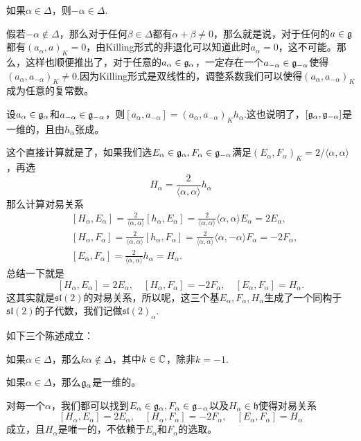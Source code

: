 \pro 如果$\alpha\in\Delta$，则$-\alpha\in\Delta$.

假若$-\alpha\notin\Delta$，那么对于任何$\beta\in\Delta$都有$\alpha+\beta\neq 0$，那么就是说，对于任何的$a\in {\mathfrak{g}}$都有$(a_\alpha,a)_K=0$，由Killing形式的非退化可以知道此时$a_\alpha=0$，这不可能。那么，这样也顺便推出了，对于任意的$a_\alpha\in{\mathfrak{g}}_{\alpha}$，一定存在一个$a_{-\alpha}\in{\mathfrak{g}}_{-\alpha}$使得$(a_\alpha,a_{-\alpha})_K\neq 0$.因为Killing形式是双线性的，调整系数我们可以使得$(a_\alpha,a_{-\alpha})_K$成为任意的复常数。


\pro 设$a_\alpha \in {\mathfrak{g}}_\alpha$和$a_{-\alpha} \in {\mathfrak{g}}_{-\alpha}$，则$[a_{\alpha},a_{-\alpha}]=(a_{\alpha},a_{-\alpha})_Kh_\alpha$.这也说明了，$[{\mathfrak{g}}_{\alpha},{\mathfrak{g}}_{-\alpha}]$是一维的，且由$h_\alpha$张成。


这个直接计算就是了，如果我们选$E_\alpha\in{\mathfrak{g}}_\alpha,F_\alpha\in{\mathfrak{g}}_{-\alpha}$满足$(E_\alpha,F_{\alpha})_K=2/\langle \alpha,\alpha \rangle$，再选
\[
	H_\alpha=\frac{2}{\langle \alpha,\alpha \rangle}h_\alpha
\]
那么计算对易关系
\[
	\begin{split}
	&[H_\alpha,E_\alpha]=\frac{2}{\langle \alpha,\alpha \rangle}[h_\alpha,E_\alpha]=\frac{2}{\langle \alpha,\alpha \rangle}\langle \alpha,\alpha \rangle E_\alpha=2E_\alpha,\\
	&[H_\alpha,F_\alpha]=\frac{2}{\langle \alpha,\alpha \rangle}[h_\alpha,F_\alpha]=\frac{2}{\langle \alpha,\alpha \rangle}\langle \alpha,-\alpha \rangle F_\alpha=-2F_\alpha,\\
	&[E_\alpha,F_\alpha]=\frac{2}{\langle \alpha,\alpha \rangle}h_\alpha=H_\alpha.
	\end{split}
\]
总结一下就是
\[
	[H_\alpha,E_\alpha]=2E_\alpha,\quad[H_\alpha,F_\alpha]=-2F_\alpha,\quad[E_\alpha,F_\alpha]=H_\alpha.
\]
这其实就是$\mathfrak{sl}(2)$的对易关系，所以呢，这三个基$E_\alpha,F_\alpha,H_\alpha$生成了一个同构于$\mathfrak{sl}(2)$的子代数，我们记做$\mathfrak{sl}(2)_\alpha$.\

\theo 如下三个陈述成立：

如果$\alpha\in\Delta$，那么$k\alpha\notin \Delta$，其中$k\in \mathbb{C}$，除非$k=-1$.

如果$\alpha\in\Delta$，那么${\mathfrak{g}}_\alpha$是一维的。

对每一个$\alpha$，我们都可以找到$E_\alpha\in{\mathfrak{g}}_\alpha,F_\alpha\in{\mathfrak{g}}_{-\alpha}$以及$H_\alpha\in\mathfrak{h}$使得对易关系
\[
[H_\alpha,E_\alpha]=2E_\alpha,\quad[H_\alpha,F_\alpha]=-2F_\alpha,\quad[E_\alpha,F_\alpha]=H_\alpha
\]
成立，且$H_\alpha$是唯一的，不依赖于$E_\alpha$和$F_\alpha$的选取。

